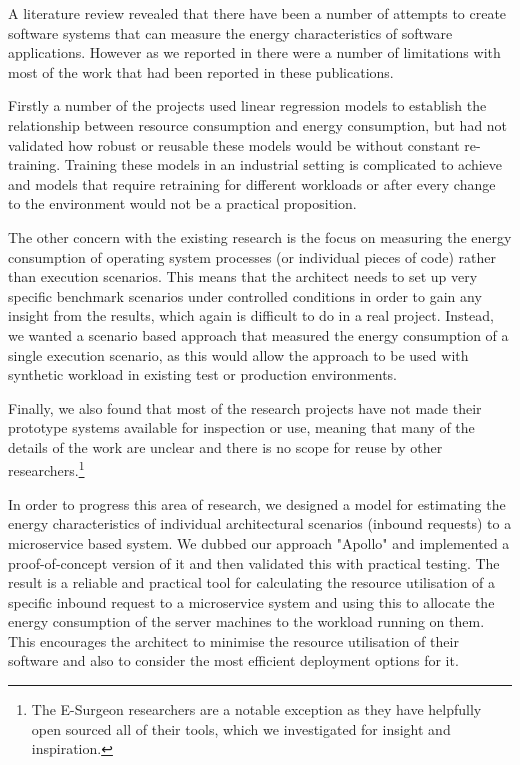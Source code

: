 A literature review revealed that there have been a number of attempts to create software systems that can measure the energy characteristics of software applications.  However as we reported in  there were a number of limitations with most of the work that had been reported in these publications.  

Firstly a number of the projects used linear regression models to establish the relationship between resource consumption and energy consumption, but had not validated how robust or reusable these models would be without constant re-training.  Training these models in an industrial setting is complicated to achieve and models that require retraining for different workloads or after every change to the environment would not be a practical proposition.  

The other concern with the existing research is the focus on measuring the energy consumption of operating system processes (or individual pieces of code) rather than execution scenarios.  This means that the architect needs to set up very specific benchmark scenarios under controlled conditions in order to gain any insight from the results, which again is difficult to do in a real project.  Instead, we wanted a scenario based approach that measured the energy consumption of a single execution scenario, as this would allow the approach to be used with synthetic workload in existing test or production environments.  

Finally, we also found that most of the research projects have not made their prototype systems available for inspection or use, meaning that many of the details of the work are unclear and there is no scope for reuse by other researchers.\footnote{The E-Surgeon researchers \cite{noureddine2015-hotspots} are a notable exception as they have helpfully open sourced all of their tools, which we investigated for insight and inspiration.}

In order to progress this area of research, we designed a model for estimating the energy characteristics of individual architectural scenarios (inbound requests) to a microservice based system.  We dubbed our approach "Apollo" and implemented a proof-of-concept version of it and then validated this with practical testing.  The result is a reliable and practical tool for calculating the resource utilisation of a specific inbound request to a microservice system and using this to allocate the energy consumption of the server machines to the workload running on them. This encourages the architect to minimise the resource utilisation of their software and also to consider the most efficient deployment options for it.

